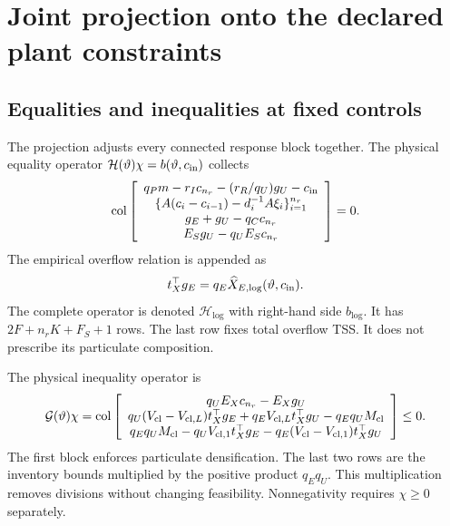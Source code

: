 \section{Joint projection onto the declared plant constraints}

\subsection{Equalities and inequalities at fixed controls}

The projection adjusts every connected response block together. The physical equality operator $\mathcal H(\vartheta)\chi=b(\vartheta,c_{\rm in})$ collects
\begin{equation}
\operatorname{col}\left[
\begin{array}{c}
q_Pm-r_Ic_{n_r}-(r_R/q_U)g_U-c_{\rm in}\\
\{A(c_i-c_{i-1})-d_i^{-1}A\xi_i\}_{i=1}^{n_r}\\
g_E+g_U-q_Cc_{n_r}\\
E_Sg_U-q_UE_Sc_{n_r}
\end{array}\right]=0.
\label{eq:plant_projection_equalities}
\end{equation}
The empirical overflow relation is appended as
\begin{equation}
t_X^\top g_E=q_E\widehat X_{E,\log}(\vartheta,c_{\rm in}).
\label{eq:plant_overflow_closure}
\end{equation}
The complete operator is denoted $\mathcal H_{\log}$ with right-hand side $b_{\log}$. It has $2F+n_rK+F_S+1$ rows. The last row fixes total overflow TSS. It does not prescribe its particulate composition.

The physical inequality operator is
\begin{equation}
\mathcal G(\vartheta)\chi=
\operatorname{col}\left[
\begin{array}{c}
q_UE_Xc_{n_r}-E_Xg_U\\
q_U(V_{\rm cl}-V_{{\rm cl},L})t_X^\top g_E
+q_EV_{{\rm cl},L}t_X^\top g_U-q_Eq_UM_{\rm cl}\\
q_Eq_UM_{\rm cl}-q_UV_{{\rm cl},1}t_X^\top g_E
-q_E(V_{\rm cl}-V_{{\rm cl},1})t_X^\top g_U
\end{array}\right]\le0.
\label{eq:plant_projection_inequalities}
\end{equation}
The first block enforces particulate densification. The last two rows are the inventory bounds multiplied by the positive product $q_Eq_U$. This multiplication removes divisions without changing feasibility. Nonnegativity requires $\chi\ge0$ separately.

